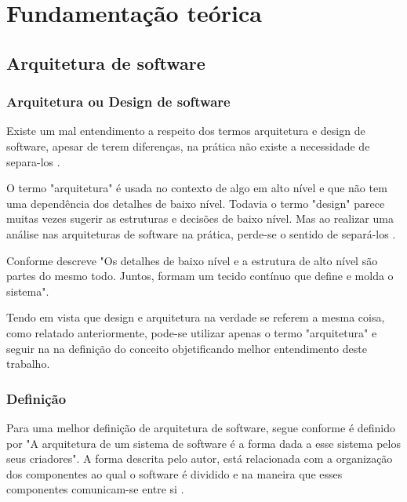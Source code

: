 \chapter{Fundamentação teórica}

\section{Arquitetura de software}
    
    \subsection{Arquitetura ou Design de software}
    
        \par Existe um mal entendimento a respeito dos termos arquitetura e design de software, apesar de terem diferenças, na prática não existe a necessidade de separa-los \cite{livro:martin:cleanarch}.
        
        \par O termo "arquitetura"\hspace{0.1cm} é usada no contexto de algo em alto nível e que não tem uma dependência dos detalhes de baixo nível. Todavia o termo "design"\hspace{0.1cm} parece muitas vezes sugerir as estruturas e decisões de baixo nível. Mas ao realizar uma análise nas arquiteturas de software na prática, perde-se o sentido de separá-los \cite{livro:martin:cleanarch}.
    
        \par Conforme descreve  "Os detalhes de baixo nível e a estrutura de alto nível são partes do mesmo todo. Juntos, formam um tecido contínuo que define e molda o sistema".
        
        \par Tendo em vista que design e arquitetura na verdade se referem a mesma coisa, como relatado anteriormente, pode-se utilizar apenas o termo "arquitetura" e seguir na na definição do conceito objetificando melhor entendimento deste trabalho.
        
    \subsection{Definição}
    
        \par Para uma melhor definição de arquitetura de software, segue conforme é definido por  "A arquitetura de um sistema de software é a forma dada a esse sistema pelos seus criadores". A forma descrita pelo autor, está relacionada com a organização dos componentes ao qual o software é dividido e na maneira que esses componentes comunicam-se entre si \cite{livro:martin:cleanarch}.
        
